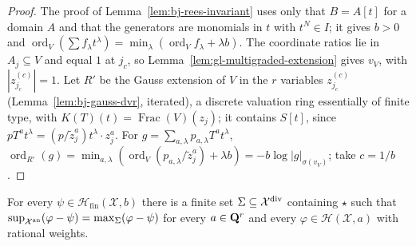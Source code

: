 \begin{proof}
The proof of Lemma~\ref{lem:bj-rees-invariant} uses only that $B=A[t]$ for a domain $A$ and that the generators are monomials in $t$ with $t^N\in I$;
it gives $b>0$ and $\operatorname{ord}_V(\sum f_\lambda t^\lambda)=\min_\lambda(\operatorname{ord}_Vf_\lambda+\lambda b)$. The coordinate ratios lie in $A_j\subseteq V$ and equal $1$ at
$j_c$, so Lemma~\ref{lem:gl-multigraded-extension} gives $v_V$, with $|z^{(c)}_{j_c}|=1$. Let $R'$ be the Gauss extension of $V$ in the $r$ variables
$z^{(c)}_{j_c}$ (Lemma~\ref{lem:bj-gauss-dvr}, iterated), a discrete valuation ring essentially of finite type, with $K(T)(t)=\operatorname{Frac}(V)(z_j)$; it
contains $S[t]$, since $pT^at^\lambda=(p/\tilde z_j^a)t^\lambda\cdot z_j^a$. For $g=\sum_{a,\lambda}p_{a,\lambda}T^at^\lambda$,
$\operatorname{ord}_{R'}(g)=\min_{a,\lambda}(\operatorname{ord}_V(p_{a,\lambda}/\tilde z_j^a)+\lambda b)=-b\log|g|_{\sigma(v_V)}$; take $c=1/b$.
\end{proof}

\begin{lemma}\label{lem:gl-shilov}
\leanok
{}
For every $\psi\in\mathcal H_{\mathrm{fin}}(\mathcal X,b)$ there is a finite set $\Sigma\subseteq\mathcal X^{\mathrm{div}}$ containing $\star$ such that
$\sup_{\mathcal X^{\mathrm{an}}}(\varphi-\psi)=\max_\Sigma(\varphi-\psi)$ for every $a\in\mathbf{Q}^r$ and every $\varphi\in\mathcal H(\mathcal X,a)$ with rational weights.
\end{lemma}

